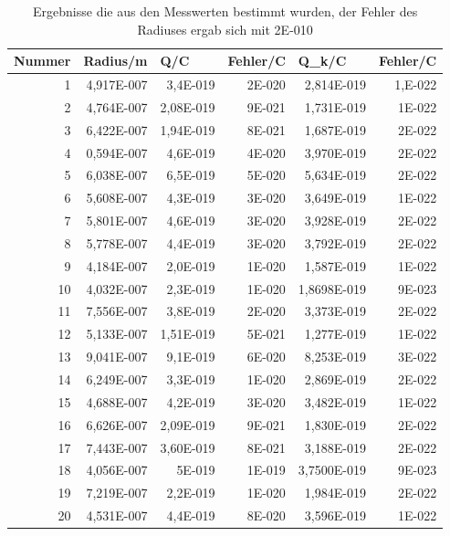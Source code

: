 \documentclass[12pt]{scrartcl}
\begin{document}
\begin{table}[H]
\caption{Ergebnisse die aus den Messwerten bestimmt wurden, der Fehler des Radiuses ergab sich mit 2E-010}
\begin{center}
\begin{tabular}{|r|r|r|r|r|r|}
\hline
\multicolumn{1}{|l|}{Nummer} & \multicolumn{1}{|l|}{Radius/m} & \multicolumn{1}{l|}{Q/C} & \multicolumn{1}{l|}{Fehler/C} & \multicolumn{1}{l|}{Q\_k/C} & \multicolumn{1}{l|}{Fehler/C} \\ \hline
1 & 4,917E-007 & 3,4E-019 & 2E-020 & 2,814E-019 & 1,E-022 \\ \hline
2 & 4,764E-007 & 2,08E-019 & 9E-021 & 1,731E-019 & 1E-022 \\ \hline
3 & 6,422E-007 & 1,94E-019 & 8E-021 & 1,687E-019 & 2E-022 \\ \hline
4 & 0,594E-007 & 4,6E-019 & 4E-020 & 3,970E-019 & 2E-022 \\ \hline
5 & 6,038E-007 & 6,5E-019 & 5E-020 & 5,634E-019 & 2E-022 \\ \hline
6 & 5,608E-007 & 4,3E-019 & 3E-020 & 3,649E-019 & 1E-022 \\ \hline
7 & 5,801E-007 & 4,6E-019 & 3E-020 & 3,928E-019 & 2E-022 \\ \hline
8 & 5,778E-007 & 4,4E-019 & 3E-020 & 3,792E-019 & 2E-022 \\ \hline
9 & 4,184E-007 & 2,0E-019 & 1E-020 & 1,587E-019 & 1E-022 \\ \hline
10 & 4,032E-007 & 2,3E-019 & 1E-020 & 1,8698E-019 & 9E-023 \\ \hline
11 & 7,556E-007 & 3,8E-019 & 2E-020 & 3,373E-019 & 2E-022 \\ \hline
12 & 5,133E-007 & 1,51E-019 & 5E-021 & 1,277E-019 & 1E-022 \\ \hline
13 & 9,041E-007 & 9,1E-019 & 6E-020 & 8,253E-019 & 3E-022 \\ \hline
14 & 6,249E-007 & 3,3E-019 & 1E-020 & 2,869E-019 & 2E-022 \\ \hline
15 & 4,688E-007 & 4,2E-019 & 3E-020 & 3,482E-019 & 1E-022 \\ \hline
16 & 6,626E-007 & 2,09E-019 & 9E-021 & 1,830E-019 & 2E-022 \\ \hline
17 & 7,443E-007 & 3,60E-019 & 8E-021 & 3,188E-019 & 2E-022 \\ \hline
18 & 4,056E-007 & 5E-019 & 1E-019 & 3,7500E-019 & 9E-023 \\ \hline
19 & 7,219E-007 & 2,2E-019 & 1E-020 & 1,984E-019 & 2E-022 \\ \hline
20 & 4,531E-007 & 4,4E-019 & 8E-020 & 3,596E-019 & 1E-022 \\ \hline

\end{tabular}
\end{center}
\end{table}
\end{document}
